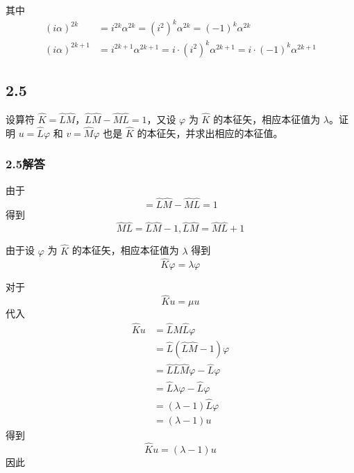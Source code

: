 其中
\begin{equation}
    \begin{aligned}
        \left( i\alpha \right) ^{2k}&=i^{2k}\alpha ^{2k}=\left( i^2 \right) ^k\alpha ^{2k}=\left( -1 \right) ^k\alpha ^{2k}
\\
\left( i\alpha \right) ^{2k+1}&=i^{2k+1}\alpha ^{2k+1}=i\cdot \left( i^2 \right) ^k\alpha ^{2k+1}=i\cdot \left( -1 \right) ^k\alpha ^{2k+1}
    \end{aligned}
\end{equation}

\newpage
\subsection{2.5}
设算符 $\hat{K} = \hat{L} \hat{M}$，$\hat{L} \hat{M} - \hat{M} \hat{L} = 1$，又设 $\varphi$ 为 $\hat{K}$ 的本征矢，相应本征值为 $\lambda$。证明 $u = \hat{L} \varphi$ 和 $v = \hat{M} \varphi$ 也是 $\hat{K}$ 的本征矢，并求出相应的本征值。

\subsubsection{2.5解答}
由于
\begin{equation}
    [ \hat{L},\hat{M} ] =\hat{L}\hat{M}-\hat{M}\hat{L}=1
\end{equation}
得到
\begin{equation}
    \hat{M}\hat{L}=\hat{L}\hat{M}-1,\hat{L}\hat{M}=\hat{M}\hat{L}+1
\end{equation}

由于设 $\varphi$ 为 $\hat{K}$ 的本征矢，相应本征值为 $\lambda$
得到
\begin{equation}
    \hat{K}\varphi =\lambda \varphi 
\end{equation}

对于
\begin{equation}
    \hat{K}u=\mu u
\end{equation}
代入
\begin{equation}
    \begin{aligned}
        \hat{K}u&=\hat{L}\hat{M}\hat{L}\varphi 
\\
&=\hat{L}\left( \hat{L}\hat{M}-1 \right) \varphi 
\\
&=\hat{L}\hat{L}\hat{M}\varphi -\hat{L}\varphi 
\\
&=\hat{L}\lambda \varphi -\hat{L}\varphi 
\\
&=\left( \lambda -1 \right) \hat{L}\varphi 
\\
&=\left( \lambda -1 \right) u
    \end{aligned}
\end{equation}
得到
\begin{equation}
    \hat{K}u=\left( \lambda -1 \right) u
\end{equation}
因此

